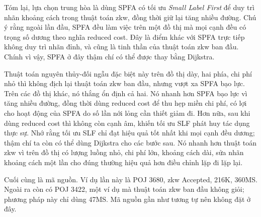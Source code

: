 \documentclass[11pt]{article}
\begin{document}
Tóm lại, lựa chọn trung hòa là dùng SPFA có tối ưu \textit{Small Label First}
để duy trì nhãn khoảng cách trong thuật toán zkw, đồng thời giữ lại tăng nhiều
đường. Chú ý rằng ngoài lần đầu, SPFA đều làm việc trên một đồ thị mà mọi cạnh
đều có trọng số dương theo nghĩa reduced cost. Đây là điểm khác với SPFA trực
tiếp không duy trì nhãn đỉnh, và cũng là tinh thần của thuật toán zkw ban đầu.
Chính vì vậy, SPFA ở đây thậm chí có thể được thay bằng Dijkstra.

Thuật toán nguyên thủy-đối ngẫu đặc biệt này trên đồ thị dày, hai phía, chi
phí nhỏ thì không địch lại thuật toán zkw ban đầu, nhưng vượt xa SPFA bạo lực.
Trên các đồ thị khác, nó thắng ổn định cả hai. Nó nhanh hơn SPFA bạo lực vì
tăng nhiều đường, đồng thời dùng reduced cost để thu hẹp miền chi phí, có lợi
cho hoạt động của SPFA do số lần nới lỏng cần thiết giảm đi. Hơn nữa, sau khi
dùng reduced cost thì không còn cạnh âm, khiến tối ưu SLF phát huy tác dụng
thực sự. Nhớ rằng tối ưu SLF chỉ đạt hiệu quả tốt nhất khi mọi cạnh đều dương;
thậm chí ta còn có thể dùng Dijkstra cho các bước sau. Nó nhanh hơn thuật toán
zkw vì trên đồ thị có lượng luồng nhỏ, chi phí lớn, khoảng cách dài, sửa nhãn
khoảng cách một lần cho đúng thường hiệu quả hơn điều chỉnh lặp đi lặp lại.

Cuối cùng là mã nguồn. Ví dụ lần này là POJ 3680, zkw Accepted, 216K, 360MS.
Ngoài ra còn có POJ 3422, một ví dụ mà thuật toán zkw ban đầu không giỏi;
phương pháp này chỉ dùng 47MS. Mã nguồn gần như tương tự nên không đặt ở đây.
\end{document}
